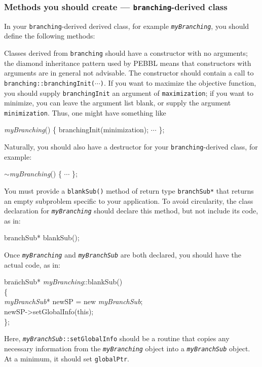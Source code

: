 \subsubsection{Methods you should create ---
  \texttt{branching}-derived class}

In your \texttt{branching}-derived derived class, for example
\texttt{\emph{myBranching}}, you should define the following methods:

Classes derived from \texttt{branching} should have a constructor with
no arguments; the diamond inheritance pattern used by PEBBL means that
constructors with arguments are in general not advisable.  The
constructor should contain a call to
\texttt{branching::\linebreak[0]branchingInit($\cdots$)}. If you want
to maximize the objective function, you should supply
\texttt{branchingInit} an argument of \texttt{maximization}; if you
want to minimize, you can leave the argument list blank, or supply the
argument \texttt{minimization}.  Thus, one might have something like
\begin{codeblock}
\emph{myBranching}() \{ branchingInit(minimization); $\cdots$ \}; \\
\end{codeblock}

Naturally, you should also have a destructor for your
\texttt{branching}-derived class, for example:
\begin{codeblock}
$\sim$\emph{myBranching}() \{ $\cdots$ \}; \\
\end{codeblock}

You must provide a \texttt{blankSub()} method of return type
\texttt{branchSub*} that returns an empty subproblem specific to your
application.  To avoid circularity, the class declaration for
\texttt{\emph{myBranching}} should declare this method, but not
include its code, as in:
\begin{codeblock}
branchSub* blankSub();
\end{codeblock}
Once
\texttt{\emph{myBranching}} and
\texttt{\emph{myBranchSub}} are both declared, you should have the
actual code, as in:
\begin{codeblock}
bra\=nchSub* \emph{myBranching}::blankSub() \\
\{ \\
\>   \emph{myBranchSub}* newSP = new \emph{myBranchSub}; \\
\>    newSP->setGlobalInfo(this);\\
\};
\end{codeblock}
Here, \texttt{\emph{myBranchSub}::setGlobalInfo} should be a routine
that copies any necessary information from the 
\texttt{\emph{myBranching}} object into a \texttt{\emph{myBranchSub}}
object.  At a minimum, it should set \texttt{globalPtr}.

